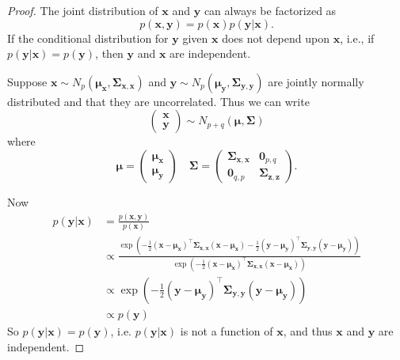 \documentclass[]{book}
\theoremstyle{definition}
\theoremstyle{definition}
\theoremstyle{definition}
\theoremstyle{remark}
\begin{document}
\begin{proof}
{}The joint distribution of \(\mathbf x\) and \(\mathbf y\) can always be factorized as
\[p(\mathbf x, \mathbf y)= p(\mathbf x)p(\mathbf y|\mathbf x).\]
If the conditional distribution for \(\mathbf y\) given \(\mathbf x\) does not depend upon \(\mathbf x\), i.e., if \(p(\mathbf y| \mathbf x)=p(\mathbf y)\), then \(\mathbf y\) and \(\mathbf x\) are independent.

Suppose \(\mathbf x\sim N_p({\boldsymbol{\mu}}_\mathbf x, \boldsymbol{\Sigma}_{\mathbf x,\mathbf x})\) and \(\mathbf y\sim N_p({\boldsymbol{\mu}}_\mathbf y, \boldsymbol{\Sigma}_{\mathbf y,\mathbf y})\) are jointly normally distributed and that they are uncorrelated. Thus we can write
\[\begin{pmatrix}\mathbf x\\ \mathbf y\end{pmatrix}\sim N_{p+q}\left({\boldsymbol{\mu}}, \boldsymbol{\Sigma}\right)
\]
where
\[{\boldsymbol{\mu}}= \begin{pmatrix}{\boldsymbol{\mu}}_\mathbf x\\ {\boldsymbol{\mu}}_{\mathbf y}\end{pmatrix}\quad \boldsymbol{\Sigma}= \begin{pmatrix} \boldsymbol{\Sigma}_{\mathbf x, \mathbf x} &\boldsymbol 0_{p,q}\\
\boldsymbol 0_{q,p} & \boldsymbol{\Sigma}_{\mathbf z, \mathbf z}\end{pmatrix}.\]

Now
\begin{align*}
p(\mathbf y|\mathbf x)&=\frac{p(\mathbf x, \mathbf y)}{p(\mathbf x)}\\
  &\propto \frac{\exp\left(-\frac{1}{2}(\mathbf x-{\boldsymbol{\mu}}_\mathbf x)^\top \boldsymbol{\Sigma}_{\mathbf x,\mathbf x}(\mathbf x-{\boldsymbol{\mu}}_\mathbf x) -\frac{1}{2}(\mathbf y-{\boldsymbol{\mu}}_\mathbf y)^\top \boldsymbol{\Sigma}_{\mathbf y,\mathbf y}(\mathbf y-{\boldsymbol{\mu}}_\mathbf y)\right)}{\exp\left(-\frac{1}{2}(\mathbf x-{\boldsymbol{\mu}}_\mathbf x)^\top \boldsymbol{\Sigma}_{\mathbf x,\mathbf x}(\mathbf x-{\boldsymbol{\mu}}_\mathbf x)\right)} \\
&\propto \exp\left(-\frac{1}{2}(\mathbf y-{\boldsymbol{\mu}}_\mathbf y)^\top \boldsymbol{\Sigma}_{\mathbf y,\mathbf y}(\mathbf y-{\boldsymbol{\mu}}_\mathbf y)\right) \\
&\propto p(\mathbf y)
\end{align*}
So \(p(\mathbf y|\mathbf x)=p(\mathbf y)\), i.e. \(p(\mathbf y|\mathbf x)\) is not a function of \(\mathbf x\), and thus \(\mathbf x\) and \(\mathbf y\) are independent.
\end{proof}
\end{document}
